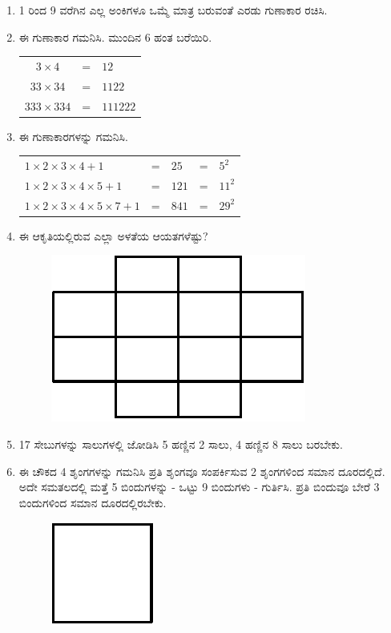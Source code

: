 \begin{enumerate}
\item 1 ರಿಂದ 9 ವರೆಗಿನ ಎಲ್ಲ ಅಂಕಿಗಳೂ ಒಮ್ಮೆ ಮಾತ್ರ ಬರುವಂತೆ ಎರಡು ಗುಣಾಕಾರ ರಚಿಸಿ. 

\item ಈ ಗುಣಾಕಾರ ಗಮನಿಸಿ. ಮುಂದಿನ 6 ಹಂತ ಬರೆಯಿರಿ. 

{\fontsize{11pt}{13pt}\selectfont
\begin{tabular}[t]{c@{\;}c@{\;}l}
$3\times 4$ & = & $12$\\
$33\times 34$ & = & $1122$\\
$333\times 334$ & = & $111222$
\end{tabular}}\relax

\item ಈ ಗುಣಾಕಾರಗಳನ್ನು ಗಮನಿಸಿ. 

\begin{tabular}[t]{l@{\;}l@{\;}l@{\;}l@{\;}l}
$1\times 2\times 3\times 4 + 1$ & = & $25$ & = & $5^{2}$\\
$1\times 2\times 3\times 4\times 5 + 1$ & = & $121$ & = & $11^{2}$\\
$1\times 2\times 3\times 4\times 5\times 7 + 1$ & = & $841$ & = & $29^{2}$
\end{tabular}

\item ಈ ಆಕೃತಿಯಲ್ಲಿರುವ ಎಲ್ಲಾ ಅಳತೆಯ ಆಯತಗಳೆಷ್ಟು? 

\vskip -0.5cm

\begin{figure}[H]
\centering
\includegraphics[scale=0.8]{images/chap12/q19.eps}
\end{figure}

\item 17 ಸೇಬುಗಳನ್ನು ಸಾಲುಗಳಲ್ಲಿ ಜೋಡಿಸಿ 5 ಹಣ್ಣಿನ 2 ಸಾಲು, 4 ಹಣ್ಣಿನ 8 ಸಾಲು ಬರಬೇಕು. 

\item ಈ ಚೌಕದ 4 ಶೃಂಗಗಳನ್ನು ಗಮನಿಸಿ ಪ್ರತಿ ಶೃಂಗವೂ ಸಂಪರ್ಕಿಸುವ 2 ಶೃಂಗಗಳಿಂದ ಸಮಾನ ದೂರದಲ್ಲಿದೆ. ಅದೇ ಸಮತಲದಲ್ಲಿ ಮತ್ತೆ 5 ಬಿಂದುಗಳನ್ನು - ಒಟ್ಟು 9 ಬಿಂದು\-ಗಳು - ಗುರ್ತಿಸಿ. ಪ್ರತಿ ಬಿಂದುವೂ ಬೇರೆ 3 ಬಿಂದುಗಳಿಂದ ಸಮಾನ ದೂರದಲ್ಲಿರಬೇಕು. 
\begin{figure}[H]
\centering
\includegraphics[scale=0.8]{images/chap12/q21.eps}
\end{figure}


\end{enumerate}
